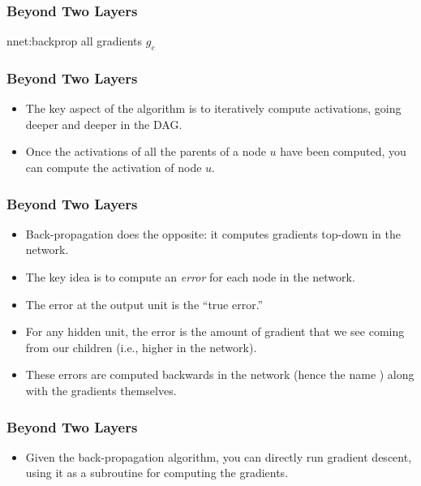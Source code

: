 \documentclass[trans]{beamer}
\begin{document}
\begin{frame}
  \frametitle{Beyond Two Layers}
\newalgorithm%
  {nnet:backprop}%
  {}
  {
\ENDFOR
\ENDFOR
\RETURN all gradients $g_e$
}
\end{frame}

\begin{frame}
  \frametitle{Beyond Two Layers}
\begin{itemize}
\item
The key aspect of the  algorithm is to
iteratively compute activations, going deeper and deeper in the DAG.
\item Once the activations of all the parents of a node $u$ have been
computed, you can compute the activation of node $u$.  
\end{itemize}
\end{frame}

\begin{frame}
  \frametitle{Beyond Two Layers}
\begin{itemize}
\item
Back-propagation does the
opposite: it computes gradients top-down in the network.
\item  The key idea
is to compute an \emph{error} for each node in the network.  
\item The error
at the output unit is the ``true error.''
\item   For any hidden unit, the
error is the amount of gradient that we see coming from our children
(i.e., higher in the network).
\item  These errors are computed backwards in
the network (hence the name ) along with the
gradients themselves.
\end{itemize}
\end{frame}

\begin{frame}
  \frametitle{Beyond Two Layers}
\begin{itemize}
\item
Given the back-propagation algorithm, you can directly run gradient
descent, using it as a subroutine for computing the gradients.
\end{itemize}
\end{frame}
\end{document}
